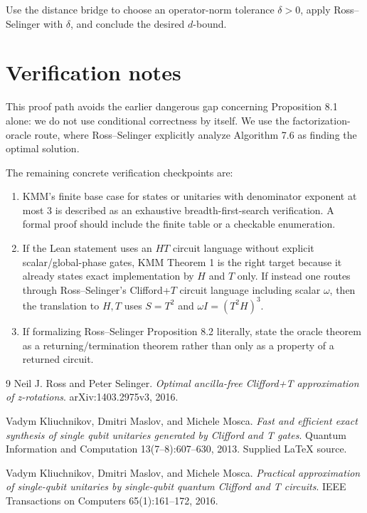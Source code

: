 \documentclass[11pt]{article}
\begin{document}
Use the distance bridge to choose an operator-norm tolerance $\delta>0$, apply Ross--Selinger with $\delta$, and conclude the desired $d$-bound.

\section{Verification notes}

This proof path avoids the earlier dangerous gap concerning Proposition 8.1 alone: we do not use conditional correctness by itself. We use the factorization-oracle route, where Ross--Selinger explicitly analyze Algorithm 7.6 as finding the optimal solution.

The remaining concrete verification checkpoints are:
\begin{enumerate}
\item KMM's finite base case for states or unitaries with denominator exponent at most $3$ is described as an exhaustive breadth-first-search verification. A formal proof should include the finite table or a checkable enumeration.
\item If the Lean statement uses an $HT$ circuit language without explicit scalar/global-phase gates, KMM Theorem 1 is the right target because it already states exact implementation by $H$ and $T$ only. If instead one routes through Ross--Selinger's Clifford+$T$ circuit language including scalar $\omega$, then the translation to $H,T$ uses $S=T^2$ and $\omega I=(T^2H)^3$.
\item If formalizing Ross--Selinger Proposition 8.2 literally, state the oracle theorem as a returning/termination theorem rather than only as a property of a returned circuit.
\end{enumerate}

\begin{thebibliography}{9}
Neil J. Ross and Peter Selinger.
\newblock \emph{Optimal ancilla-free Clifford+T approximation of z-rotations}.
\newblock arXiv:1403.2975v3, 2016.

Vadym Kliuchnikov, Dmitri Maslov, and Michele Mosca.
\newblock \emph{Fast and efficient exact synthesis of single qubit unitaries generated by Clifford and T gates}.
\newblock Quantum Information and Computation 13(7--8):607--630, 2013. Supplied LaTeX source.

Vadym Kliuchnikov, Dmitri Maslov, and Michele Mosca.
\newblock \emph{Practical approximation of single-qubit unitaries by single-qubit quantum Clifford and T circuits}.
\newblock IEEE Transactions on Computers 65(1):161--172, 2016.
\end{thebibliography}
\end{document}
